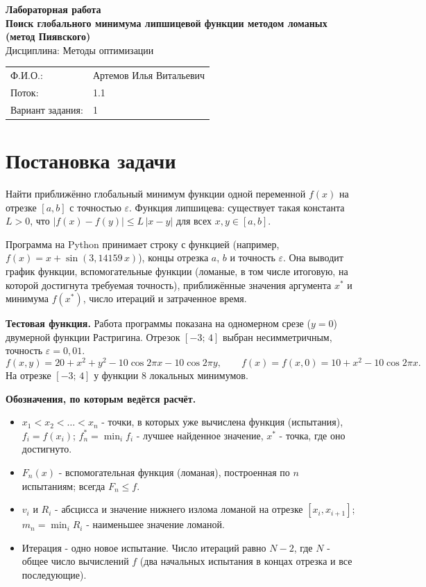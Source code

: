\documentclass[a4paper,12pt]{article}
\begin{document}
\begin{center}
{\large\bfseries Лабораторная работа\\[2pt]
Поиск глобального минимума липшицевой функции методом ломаных (метод Пиявского)}\\[4pt]
Дисциплина: Методы оптимизации
\end{center}

\begin{tabular}{@{}ll}
Ф.И.О.: & Артемов Илья Витальевич\\
Поток: & 1.1\\
Вариант задания: & 1\\
\end{tabular}

\section{Постановка задачи}

Найти приближённо глобальный минимум функции одной переменной $f(x)$ на отрезке $[a,b]$ с точностью $\varepsilon$. Функция липшицева: существует такая константа $L > 0$, что $|f(x) - f(y)| \le L\,|x - y|$ для всех $x, y \in [a,b]$.

Программа на Python принимает строку с функцией (например, $f(x) = x + \sin(3{,}14159\,x)$), концы отрезка $a$, $b$ и точность $\varepsilon$. Она выводит график функции, вспомогательные функции (ломаные, в том числе итоговую, на которой достигнута требуемая точность), приближённые значения аргумента $x^*$ и минимума $f(x^*)$, число итераций и затраченное время.

\textbf{Тестовая функция.} Работа программы показана на одномерном срезе ($y = 0$) двумерной функции Растригина. Отрезок $[-3;\,4]$ выбран несимметричным, точность $\varepsilon = 0{,}01$.
\[
f(x,y) = 20 + x^2 + y^2 - 10\cos 2\pi x - 10\cos 2\pi y,
\qquad
f(x) = f(x,0) = 10 + x^2 - 10\cos 2\pi x.
\]
На отрезке $[-3;\,4]$ у функции 8 локальных минимумов.

\textbf{Обозначения, по которым ведётся расчёт.}
\begin{itemize}
\item $x_1 < x_2 < \dots < x_n$ - точки, в которых уже вычислена функция (испытания), $f_i = f(x_i)$; $f^*_n = \min_i f_i$ - лучшее найденное значение, $x^*$ - точка, где оно достигнуто.
\item $F_n(x)$ - вспомогательная функция (ломаная), построенная по $n$ испытаниям; всегда $F_n \le f$.
\item $v_i$ и $R_i$ - абсцисса и значение нижнего излома ломаной на отрезке $[x_i, x_{i+1}]$; $m_n = \min_i R_i$ - наименьшее значение ломаной.
\item Итерация - одно новое испытание. Число итераций равно $N - 2$, где $N$ - общее число вычислений $f$ (два начальных испытания в концах отрезка и все последующие).
\end{itemize}
\end{document}
